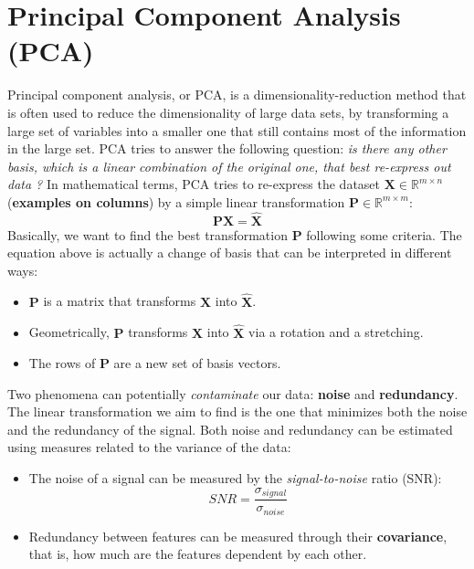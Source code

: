 \section{Principal Component Analysis (PCA)}
Principal component analysis, or PCA, is a dimensionality-reduction method that is often used to reduce the dimensionality of large data sets, by transforming a large set of variables into a smaller one that still contains most of the information in the large set.\newline\newline
PCA tries to answer the following question: \textit{is there any other basis, which is a linear combination of the original one, that best re-express out data ?} In mathematical terms, PCA tries to re-express the dataset $\textbf{X} \in \mathbb{R}^{m \times n}$ (\textbf{examples on columns}) by a simple linear transformation $\textbf{P} \in \mathbb{R}^{m \times m}$:
\[\textbf{PX} = \hat{\textbf{X}}\]
Basically, we want to find the best transformation $\textbf{P}$ following some criteria.\newline\newline
The equation above is actually a change of basis that can be interpreted in different ways:
\begin{itemize}
    \item $\textbf{P}$ is a matrix that transforms $\textbf{X}$ into $\hat{\textbf{X}}$.

    \item Geometrically, $\textbf{P}$ transforms $\textbf{X}$ into $\hat{\textbf{X}}$ via a rotation and a stretching.

    \item The rows of $\textbf{P}$ are a new set of basis vectors.
\end{itemize}
Two phenomena can potentially \textit{contaminate} our data: \textbf{noise} and \textbf{redundancy}. The linear transformation we aim to find is the one that minimizes both the noise and the redundancy of the signal.\newline\newline
Both noise and redundancy can be estimated using measures related to the variance of the data:
\begin{itemize}
    \item The noise of a signal can be measured by the \textit{signal-to-noise} ratio (SNR):
    \[SNR = \frac{\sigma_{signal}}{\sigma_{noise}}\]

    \item Redundancy between features can be measured through their \textbf{covariance}, that is, how much are the features dependent by each other.
\end{itemize}
